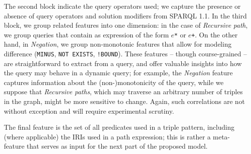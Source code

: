 \documentclass[runningheads]{llncs}
\begin{document}
The second block indicate the query operators used; we capture the presence or absence of query operators and solution modifiers from SPARQL 1.1. In the third block, we group related features into one dimension: in the case of \textit{Recursive path}, we group queries that contain as expression of the form $e$\texttt{*} or $e$\texttt{+}. On the other hand, in \textit{Negation}, we group non-monotonic features that allow for modeling difference (\texttt{MINUS}, \texttt{NOT EXISTS}, \texttt{!BOUND}). These features -- though course-grained -- are straightforward to extract from a query, and offer valuable insights into how the query may behave in a dynamic query; for example, the \textit{Negation} feature captures information about the (non-)monotonicity of the query, while we suppose that \textit{Recursive paths}, which may traverse an arbitrary number of triples in the graph, might be more sensitive to change. Again, such correlations are not without exception and will require experimental scrutiny.

The final feature is the set of all predicates used in a triple pattern, including (where applicable) the IRIs used in a path expression; this is rather a meta-feature that serves as input for the next part of the proposed model.
\end{document}
